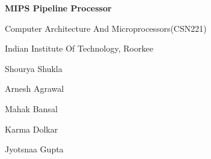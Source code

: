 \documentclass[12pt]{article}
\begin{document}
\vspace{\baselineskip}

\vspace{\baselineskip}

\vspace{\baselineskip}

\vspace{\baselineskip}
{\fontsize{22pt}{26.4pt}\selectfont \textbf{MIPS Pipeline Processor}\par}\par


\vspace{\baselineskip}
{\fontsize{18pt}{21.6pt}\selectfont Computer Architecture And Microprocessors(CSN221)\par}\par

{\fontsize{18pt}{21.6pt}\selectfont Indian Institute Of Technology, Roorkee\par}\par


\vspace{\baselineskip}

\vspace{\baselineskip}

\vspace{\baselineskip}

\vspace{\baselineskip}

\vspace{\baselineskip}

\vspace{\baselineskip}
{\fontsize{18pt}{21.6pt}\selectfont Shourya Shukla\par}\par

{\fontsize{18pt}{21.6pt}\selectfont Arnesh Agrawal\par}\par

{\fontsize{18pt}{21.6pt}\selectfont Mahak Bansal\par}\par


\vspace{\baselineskip}
{\fontsize{18pt}{21.6pt}\selectfont Karma Dolkar\par}\par

{\fontsize{18pt}{21.6pt}\selectfont Jyotsnaa Gupta\par}\par
\end{document}
